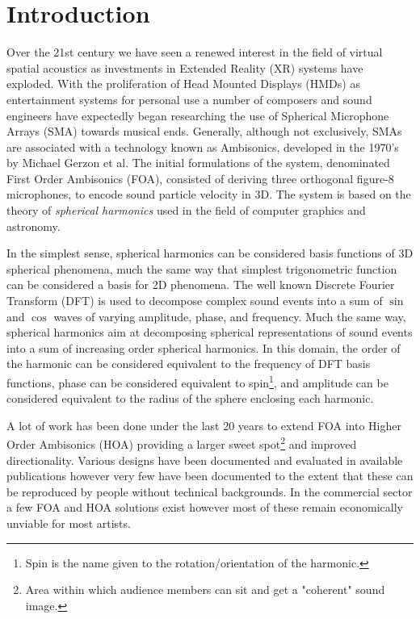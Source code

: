 \section{Introduction}
Over the 21st century we have seen a renewed interest in the field of virtual spatial acoustics as investments in Extended Reality (XR) systems have exploded. With the proliferation of Head Mounted Displays (HMDs) as entertainment systems for personal use a number of composers and sound engineers have expectedly began researching the use of Spherical Microphone Arrays (SMA) towards musical ends. 
Generally, although not exclusively, SMAs are associated with a technology known as Ambisonics, developed in the 1970's by Michael Gerzon et al. The initial formulations of the system, denominated First Order Ambisonics (FOA), consisted of deriving three orthogonal figure-8 microphones, to encode sound particle velocity in 3D. The system is based on the theory of \textit{spherical harmonics} used in the field of computer graphics and astronomy. 

In the simplest sense, spherical harmonics can be considered basis functions of 3D spherical phenomena, much the same way that simplest trigonometric function can be considered a basis for 2D phenomena. The well known Discrete Fourier Transform (DFT) is used to decompose complex sound events into a sum of $\sin$ and $\cos$ waves of varying amplitude, phase, and frequency. Much the same way, spherical harmonics aim at decomposing spherical representations of sound events into a sum of increasing order spherical harmonics. In this domain, the order of the harmonic can be considered equivalent to the frequency of DFT basis functions, phase can be considered equivalent to spin\footnote{Spin is the name given to the rotation/orientation of the harmonic.}, and amplitude can be considered equivalent to the radius of the sphere enclosing each harmonic. 

A lot of work has been done under the last 20 years to extend FOA into Higher Order Ambisonics (HOA) providing a larger sweet spot\footnote{Area within which audience members can sit and get a "coherent" sound image.} and improved directionality. Various designs have been documented and evaluated in available publications however very few have been documented to the extent that these can be reproduced by people without technical backgrounds. In the commercial sector a few FOA and HOA solutions exist however most of these remain economically unviable for most artists. 

